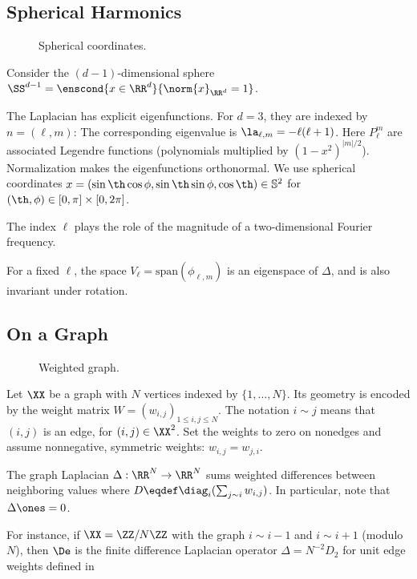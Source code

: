                                                 
\subsection{Spherical Harmonics}
\label{sec-spherical-harm}

\begin{figure}[tbp]
\centering
{}
\caption{Spherical coordinates.}
\label{fig-review-fourier-spherical-coordinates}
\end{figure}
Consider the $(d-1)$-dimensional sphere $\SS^{d-1} = \enscond{x \in \RR^d}{\norm{x}_{\RR^d}=1}$.
  
The Laplacian has explicit eigenfunctions. For $d=3$, they are indexed by $n=(\ell,m)$:
The corresponding eigenvalue is $\la_{\ell,m} = -\ell(\ell+1)$. Here $P_{\ell}^m$ are associated Legendre functions (polynomials multiplied by $(1-x^2)^{|m|/2}$). Normalization makes the eigenfunctions orthonormal. We use spherical coordinates $x=(\sin\th\cos\phi,\sin\th\sin\phi,\cos\th)\in\mathbb S^2$ for $(\th,\phi) \in [0,\pi] \times [0,2\pi]$.
 
The index $\ell$ plays the role of the magnitude of a two-dimensional Fourier frequency.
 
For a fixed $\ell$, the space $V_\ell = \text{span}( \phi_{\ell,m} )$ is an eigenspace of $\Delta$, and is also invariant under rotation. 
	

                                                
\subsection{On a Graph}

\begin{figure}[tbp]
\centering
{}
\caption{Weighted graph.}
\label{fig-review-fourier-weighted-graph}
\end{figure}
Let $\XX$ be a graph with $N$ vertices indexed by $\{1,\ldots,N\}$. Its geometry is encoded by the weight matrix $W=(w_{i,j})_{1\leq i,j\leq N}$. The notation $i \sim j$ means that $(i,j)$ is an edge, for $(i,j) \in \XX^2$. Set the weights to zero on nonedges and assume nonnegative, symmetric weights: $w_{i,j}=w_{j,i}$.

The graph Laplacian $\Delta:\RR^N\to\RR^N$ sums weighted differences between neighboring values
where $D \eqdef \diag_i(\sum_{j \sim i} w_{i,j})$. In particular, note that $\Delta\ones=0$.

For instance, if $\XX = \ZZ/N\ZZ$ with the graph $i \sim i-1$ and $i \sim i+1$ (modulo $N$), then $\De$ is the finite difference Laplacian operator $\Delta=N^{-2}D_2$ for unit edge weights defined in~\